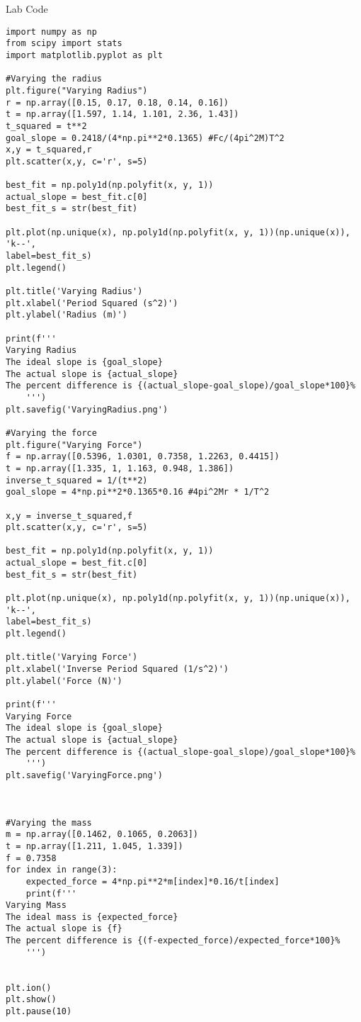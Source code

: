 Lab Code \\
\begin{lstlisting}
import numpy as np
from scipy import stats
import matplotlib.pyplot as plt

#Varying the radius
plt.figure("Varying Radius")
r = np.array([0.15, 0.17, 0.18, 0.14, 0.16])
t = np.array([1.597, 1.14, 1.101, 2.36, 1.43])
t_squared = t**2
goal_slope = 0.2418/(4*np.pi**2*0.1365) #Fc/(4pi^2M)T^2
x,y = t_squared,r
plt.scatter(x,y, c='r', s=5)

best_fit = np.poly1d(np.polyfit(x, y, 1))
actual_slope = best_fit.c[0]
best_fit_s = str(best_fit)

plt.plot(np.unique(x), np.poly1d(np.polyfit(x, y, 1))(np.unique(x)), 'k--',
label=best_fit_s)
plt.legend()

plt.title('Varying Radius')
plt.xlabel('Period Squared (s^2)')
plt.ylabel('Radius (m)')

print(f'''
Varying Radius
The ideal slope is {goal_slope}
The actual slope is {actual_slope}
The percent difference is {(actual_slope-goal_slope)/goal_slope*100}%
    ''')
plt.savefig('VaryingRadius.png')

#Varying the force
plt.figure("Varying Force")
f = np.array([0.5396, 1.0301, 0.7358, 1.2263, 0.4415])
t = np.array([1.335, 1, 1.163, 0.948, 1.386])
inverse_t_squared = 1/(t**2)
goal_slope = 4*np.pi**2*0.1365*0.16 #4pi^2Mr * 1/T^2

x,y = inverse_t_squared,f
plt.scatter(x,y, c='r', s=5)

best_fit = np.poly1d(np.polyfit(x, y, 1))
actual_slope = best_fit.c[0]
best_fit_s = str(best_fit)

plt.plot(np.unique(x), np.poly1d(np.polyfit(x, y, 1))(np.unique(x)), 'k--',
label=best_fit_s)
plt.legend()

plt.title('Varying Force')
plt.xlabel('Inverse Period Squared (1/s^2)')
plt.ylabel('Force (N)')

print(f'''
Varying Force
The ideal slope is {goal_slope}
The actual slope is {actual_slope}
The percent difference is {(actual_slope-goal_slope)/goal_slope*100}%
    ''')
plt.savefig('VaryingForce.png')



#Varying the mass
m = np.array([0.1462, 0.1065, 0.2063])
t = np.array([1.211, 1.045, 1.339])
f = 0.7358
for index in range(3):
    expected_force = 4*np.pi**2*m[index]*0.16/t[index]
    print(f'''
Varying Mass
The ideal mass is {expected_force}
The actual slope is {f}
The percent difference is {(f-expected_force)/expected_force*100}%
    ''')


plt.ion()
plt.show()
plt.pause(10)
\end{lstlisting}
